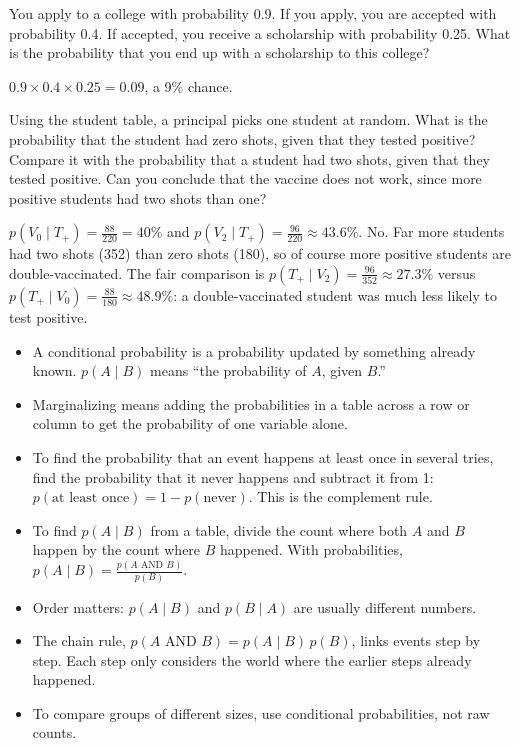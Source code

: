 \begin{Exercise}[label=cp2, title=Chaining Probabilities]
You apply to a college with probability 0.9. If you apply, you are
accepted with probability 0.4. If accepted, you receive a scholarship with
probability 0.25. What is the probability that you end up with a
scholarship to this college?
\end{Exercise}
\begin{Answer}[ref=cp2]
$0.9 \times 0.4 \times 0.25 = 0.09$, a 9\% chance.
\end{Answer}

\begin{Exercise}[label=cp3, title=Two Shots]
Using the student table, a principal picks one student at random. What is
the probability that the student had zero shots, given that they tested
positive? Compare it with the probability that a student had two shots,
given that they tested positive. Can you conclude that the vaccine does
not work, since more positive students had two shots than one?
\end{Exercise}
\begin{Answer}[ref=cp3]
$p(V_0 \mid T_{+}) = \frac{88}{220} = 40\%$ and $p(V_2 \mid T_{+}) = \frac{96}{220} \approx 43.6\%$.
No. Far more students had two shots (352) than zero shots (180), so of
course more positive students are double-vaccinated. The fair comparison
is $p(T_{+} \mid V_2) = \frac{96}{352} \approx 27.3\%$ versus $p(T_{+} \mid
V_0) = \frac{88}{180} \approx 48.9\%$: a double-vaccinated student was much
less likely to test positive.
\end{Answer}

\begin{mdframed}[style=important, frametitle={Key Ideas}]
\begin{itemize}
\item A conditional probability is a probability updated by something already known. $p(A \mid B)$ means ``the probability of $A$, given $B$.''
\item Marginalizing means adding the probabilities in a table across a row or column to get the probability of one variable alone.
\item To find the probability that an event happens at least once in several tries, find the probability that it never happens and subtract it from 1: $p(\text{at least once}) = 1 - p(\text{never})$. This is the complement rule.
\item To find $p(A \mid B)$ from a table, divide the count where both $A$ and $B$ happen by the count where $B$ happened. With probabilities, $p(A \mid B) = \frac{p(A \text{ AND } B)}{p(B)}$.
\item Order matters: $p(A \mid B)$ and $p(B \mid A)$ are usually different numbers.
\item The chain rule, $p(A \text{ AND } B) = p(A \mid B)\,p(B)$, links events step by step. Each step only considers the world where the earlier steps already happened.
\item To compare groups of different sizes, use conditional probabilities, not raw counts.
\end{itemize}
\end{mdframed}
